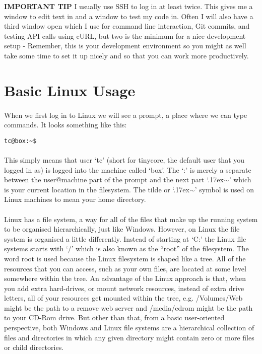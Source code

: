\documentclass[12pt, a4paper, twoside]{book}
\begin{document}
\begin{framed}
\textbf{IMPORTANT TIP} I usually use SSH to log in at least twice. This gives me a window to edit text in and a window to test my code in. Often I will also have a third window open which I use for command line interaction, Git commits, and testing API calls using cURL, but two is the minimum for a nice development setup - Remember, this is your development environment so you might as well take some time to set it up nicely and so that you can work more productively.
\end{framed}


\section{Basic Linux Usage}
\label{linux}

\paragraph{} When we first log in to Linux we will see a prompt, a place where we can type commands. It looks something like this:

\begin{lstlisting}[style=DOS]
    tc@box:~$ 
\end{lstlisting}
\paragraph{} This simply means that user `tc' (short for tinycore, the default user that you logged in as) is logged into the machine called `box'. The `:' is merely a separate between the user@machine part of the prompt and the next part `{\raise.17ex\hbox{$\scriptstyle\sim$}}' which is your current location in the filesystem. The tilde or `{\raise.17ex\hbox{$\scriptstyle\sim$}}' symbol is used on Linux machines to mean your home directory.

\paragraph{} Linux has a file system, a way for all of the files that make up the running system to be organised hierarchically, just like Windows. However, on Linux the file system is organised a little differently. Instead of starting at `C:' the Linux file systems starts with `/' which is also known as the ``root'' of the filesystem. The word root is used because the Linux filesystem is shaped like a tree. All of the resources that you can access, such as your own files, are located at some level somewhere within the tree. An advantage of the Linux approach is that, when you add extra hard-drives, or mount network resources, instead of extra drive letters, all of your resources get mounted within the tree, e.g. /Volumes/Web might be the path to a remove web server and /media/cdrom might be the path to your CD-Rom drive. But other than that, from a basic user-oriented perspective, both Windows and Linux file systems are a hierarchical collection of files and directories in which any given directory might contain zero or more files or child directories.
\end{document}
